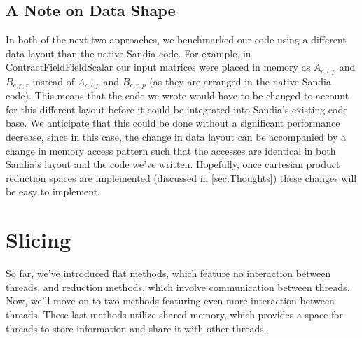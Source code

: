 \subsection{A Note on Data Shape}
In both of the next two approaches, we benchmarked our code using a different data layout than the native
Sandia code. For example, in ContractFieldFieldScalar our input matrices were placed in memory as $A_{c,l,p}$ and
$B_{c,p,r}$ instead of $A_{c,l,p}$ and $B_{c,r,p}$ (as they are arranged in the native Sandia code).
This means that the code we wrote would have to be changed to account for this different layout
before it could be integrated into Sandia's existing code base. We anticipate that this could be done without a
significant performance decrease, since in this case, the change in data layout can be accompanied by a change in 
memory access pattern such that the accesses are identical in both Sandia's layout and the code we've written.
Hopefully, once cartesian product reduction spaces are implemented (discussed in \ref{sec:Thoughts}) these 
changes will be easy to implement. 
\section{Slicing} \label{sec:Slicing}
So far, we've introduced flat methods, which feature no interaction between threads, and reduction
methods, which involve communication between threads. Now, we'll move on to two methods
featuring even more interaction between threads. These last methods utilize shared memory, 
which provides a space for threads to store information and share it with other threads. 

